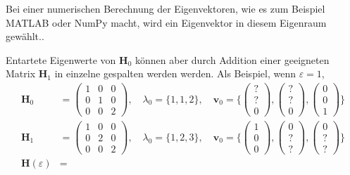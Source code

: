 Bei einer numerischen Berechnung der Eigenvektoren, wie es zum Beispiel MATLAB oder NumPy macht, wird ein Eigenvektor in diesem Eigenraum gewählt..

Entartete Eigenwerte von $\bm H_0$ können aber durch Addition einer geeigneten Matrix $\bm H_1$ in einzelne gespalten werden werden.
Als Beispiel, wenn $\varepsilon = 1$, 
\begin{align}
    \bm H_0 &= 
    \begin{pmatrix}
        1 & 0 & 0\\
        0 & 1 & 0\\
        0 & 0 & 2
    \end{pmatrix},
    \quad
    \lambda_0 = \{1, 1, 2\},
    \quad
    \bm v_0 = \{
    \begin{pmatrix}
        ?\\
        ?\\
        0
    \end{pmatrix},
    \begin{pmatrix}
        ?\\
        ?\\
        0
    \end{pmatrix},
    \begin{pmatrix}
        0\\
        0\\
        1
    \end{pmatrix}
    \}
    \\
    \bm H_1 &= 
    \begin{pmatrix}
        1 & 0 & 0\\
        0 & 2 & 0\\
        0 & 0 & 2
    \end{pmatrix},
    \quad
    \lambda_0 = \{1, 2, 3\},
    \quad
    \bm v_0 = \{
    \begin{pmatrix}
        1\\
        0\\
        0
    \end{pmatrix},
    \begin{pmatrix}
        0\\
        ?\\
        ?
    \end{pmatrix},
    \begin{pmatrix}
        0\\
        ?\\
        ?
    \end{pmatrix}
    \}
    \\
    \bm H(\varepsilon) &= 

\end{align}

